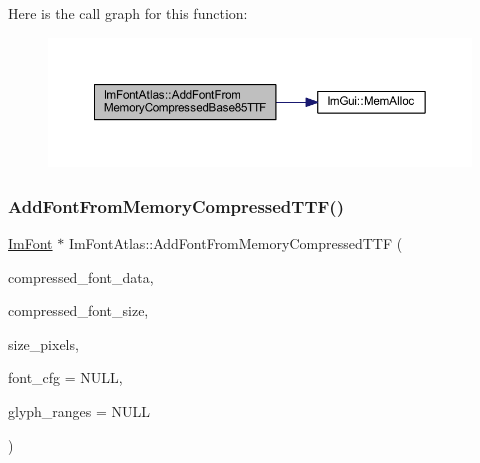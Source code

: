 Here is the call graph for this function\+:
\nopagebreak
\begin{figure}[H]
\begin{center}
\leavevmode
\includegraphics[width=350pt]{struct_im_font_atlas_ab43b930beb57c0b998f42f4586677956_cgraph}
\end{center}
\end{figure}
\mbox{\label{struct_im_font_atlas_a579bb434bd116ea9ac4f892652ccefdb}} 
\subsubsection{\texorpdfstring{Add\+Font\+From\+Memory\+Compressed\+T\+T\+F()}{AddFontFromMemoryCompressedTTF()}}
{\footnotesize\ttfamily \mbox{\hyperlink{struct_im_font}{Im\+Font}} $\ast$ Im\+Font\+Atlas\+::\+Add\+Font\+From\+Memory\+Compressed\+T\+TF (\begin{DoxyParamCaption}\item[{const void $\ast$}]{compressed\+\_\+font\+\_\+data,  }\item[{int}]{compressed\+\_\+font\+\_\+size,  }\item[{float}]{size\+\_\+pixels,  }\item[{const \mbox{\hyperlink{struct_im_font_config}{Im\+Font\+Config}} $\ast$}]{font\+\_\+cfg = {\ttfamily NULL},  }\item[{const \mbox{\hyperlink{imgui_8h_af2c7badaf05a0008e15ef76d40875e97}{Im\+Wchar}} $\ast$}]{glyph\+\_\+ranges = {\ttfamily NULL} }\end{DoxyParamCaption})}

\mbox{\label{struct_im_font_atlas_adb01397920998a18e25bd8fed3f791a7}} 
